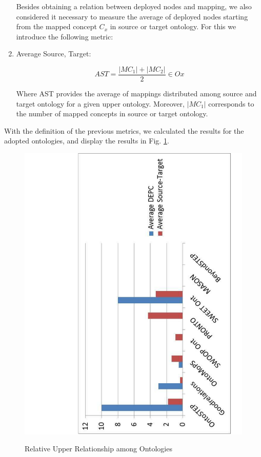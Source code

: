 \begin{enumerate}
	
	
	
	Besides obtaining a relation between deployed nodes and mapping, we also considered it necessary to measure the average of deployed nodes starting from the mapped concept $C_{x}$ in source or target ontology. For this we introduce the following metric:
	
	
	\item Average Source, Target:
	
	\begin{equation}\label{eq.4.6}
		AST =  \frac{|MC_1|+|MC_2|}{2} \in O{x}
	\end{equation}
	
	Where AST provides the average of mappings distributed among source and target ontology for a given upper ontology. Moreover, $|MC_1|$ corresponds to the number of mapped concepts in source or target ontology. 
	
	
\end{enumerate}


\noindent With the definition of the previous metrics, we calculated the results for the adopted ontologies, and  display the results in Fig. \ref{figure4-13}. 

\begin{figure}
	\begin{center}
		\includegraphics[scale=0.5, angle=-90]{figure-chapterIV/fig4-13.pdf}\\
		\caption{Relative Upper Relationship among Ontologies}
		\label{figure4-13}
	\end{center}
\end{figure}



